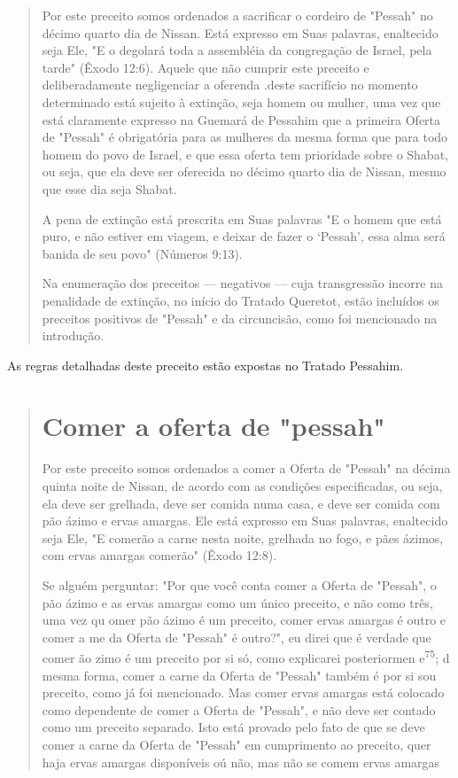 \begin{quote}
Por este preceito somos ordenados a sacrificar o cordeiro de "Pes­sah"
no décimo quarto dia de Nissan. Está expresso em Suas palavras,
enalteci­do seja Ele, "E o degolará toda a assembléia da congregação de
Israel, pela tar­de" (Êxodo 12:6). Aquele que não cumprir este preceito
e deliberadamente ne­gligenciar a oferenda .deste sacrifício no momento
determinado está sujeito à extinção, seja homem ou mulher, uma vez que
está claramente expresso na Gue­mará de Pessahim que a primeira Oferta
de "Pessah" é obrigatória para as mu­lheres da mesma forma que para todo
homem do povo de Israel, e que essa oferta tem prioridade sobre o
Shabat, ou seja, que ela deve ser oferecida no décimo quarto dia de
Nissan, mesmo que esse dia seja Shabat.

A pena de extinção está prescrita em Suas palavras "E o homem que está
puro, e não estiver em viagem, e deixar de fazer o `Pessah', essa alma
será banida de seu povo" (Números 9:13).

Na enumeração dos preceitos --- negativos --- cuja transgressão in­corre
na penalidade de extinção, no início do Tratado Queretot, estão
incluí­dos os preceitos positivos de "Pessah" e da circuncisão, como foi
mencionado na introdução.
\end{quote}

As regras detalhadas deste preceito estão expostas no Tratado Pessahim.

\begin{quote}
\section{Comer a oferta de "pessah"}

Por este preceito somos ordenados a comer a Oferta de "Pessah" na décima
quinta noite de Nissan, de acordo com as condições especificadas, ou
seja, ela deve ser grelhada, deve ser comida numa casa, e deve ser
comida com pão ázimo e ervas amargas. Ele está expresso em Suas
palavras, enaltecido seja Ele, "E comerão a carne nesta noite, grelhada
no fogo, e pães ázimos, com ervas amargas comerão" (Êxodo 12:8).

Se alguém perguntar: "Por que você conta comer a Oferta de "Pes­sah", o
pão ázimo e as ervas amargas como um único preceito, e não como três,
uma vez qu omer pão ázimo é um preceito, comer ervas amargas é ou­tro e
comer a me da Oferta de "Pessah" é outro?", eu direi que é verdade que
comer ão zimo é um preceito por si só, como explicarei posteriormen
e\textsuperscript{75}; d mesma forma, comer a carne da Oferta de
"Pessah" tam­bém é por si sou preceito, como já foi mencionado. Mas
comer ervas amar­gas está colocado como dependente de comer a Oferta de
"Pessah", e não de­ve ser contado como um preceito separado. Isto está
provado pelo fato de que se deve comer a carne da Oferta de "Pessah" em
cumprimento ao preceito, quer haja ervas amargas disponíveis oú não, mas
não se comem ervas amargas
\end{quote}

